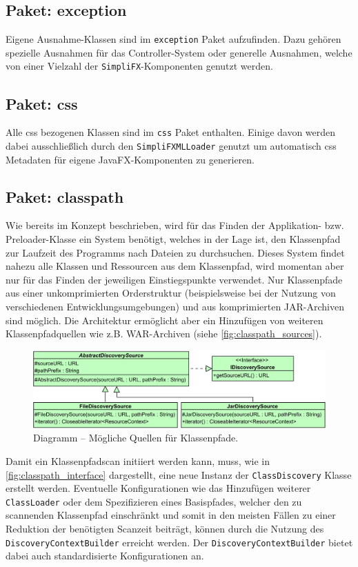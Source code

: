 \subsection{Paket: exception}
Eigene Ausnahme-Klassen sind im \texttt{exception} Paket aufzufinden. Dazu gehören spezielle Ausnahmen für das Controller-System oder generelle Ausnahmen, welche von einer Vielzahl der \texttt{SimpliFX}-Komponenten genutzt werden.
\subsection{Paket: css}
Alle \ac{css} bezogenen Klassen sind im \texttt{css} Paket enthalten. Einige davon werden dabei ausschließlich durch den \texttt{SimpliFXMLLoader} genutzt um automatisch \ac{css} Metadaten für eigene JavaFX-Komponenten zu generieren. 
\subsection{Paket: classpath}
Wie bereits im Konzept beschrieben, wird für das Finden der Applikation- bzw. Preloader-Klasse ein System benötigt, welches in der Lage ist, den Klassenpfad zur Laufzeit des Programms nach Dateien zu durchsuchen. Dieses System findet nahezu alle Klassen und Ressourcen aus dem Klassenpfad, wird momentan aber nur für das Finden der jeweiligen Einstiegspunkte verwendet. Nur Klassenpfade aus einer unkomprimierten Orderstruktur (beispielsweise bei der Nutzung von verschiedenen Entwicklungsumgebungen) und aus komprimierten JAR-Archiven sind möglich. Die Architektur ermöglicht aber ein Hinzufügen von weiteren Klassenpfadquellen wie z.B. WAR-Archiven (siehe \autoref{fig:classpath_sources}). 
\begin{figure}[H]
	\centering
	\includegraphics[width=\textwidth-2cm]{Abbildungen/Klassenpfadscan-Sources.png}
	\caption{Diagramm -- Mögliche Quellen für Klassenpfade.}
	\label{fig:classpath_sources}
\end{figure}
\noindent Damit ein Klassenpfadscan initiiert werden kann, muss, wie in \autoref{fig:classpath_interface} dargestellt, eine neue Instanz der \texttt{ClassDiscovery} Klasse erstellt werden. Eventuelle Konfigurationen wie das Hinzufügen weiterer \texttt{ClassLoader} oder dem Spezifizieren eines Basispfades, welcher den zu scannenden Klassenpfad einschränkt und somit in den meisten Fällen zu einer Reduktion der benötigten Scanzeit beiträgt, können durch die Nutzung des \texttt{DiscoveryContextBuilder} erreicht werden. Der \texttt{DiscoveryContextBuilder} bietet dabei auch standardisierte Konfigurationen an.

